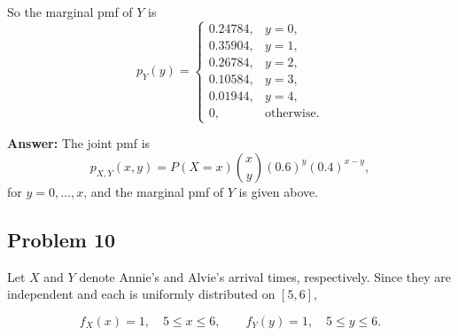 \documentclass[11pt]{article}
\begin{document}
\begin{enumerate}
    So the marginal pmf of $Y$ is
    \[
    p_Y(y)=
    \begin{cases}
    0.24784, & y=0,\\
    0.35904, & y=1,\\
    0.26784, & y=2,\\
    0.10584, & y=3,\\
    0.01944, & y=4,\\
    0, & \text{otherwise}.
    \end{cases}
    \]

    \textbf{Answer:} The joint pmf is
    \[
    p_{X,Y}(x,y)=P(X=x)\binom{x}{y}(0.6)^y(0.4)^{x-y},
    \]
    for $y=0,\dots,x$, and the marginal pmf of $Y$ is given above.
\end{enumerate}

\subsection*{Problem 10}

Let $X$ and $Y$ denote Annie's and Alvie's arrival times, respectively. Since they are independent and each is uniformly distributed on $[5,6]$,

\[
f_X(x)=1,\quad 5\le x\le 6,
\qquad
f_Y(y)=1,\quad 5\le y\le 6.
\]
\end{document}
